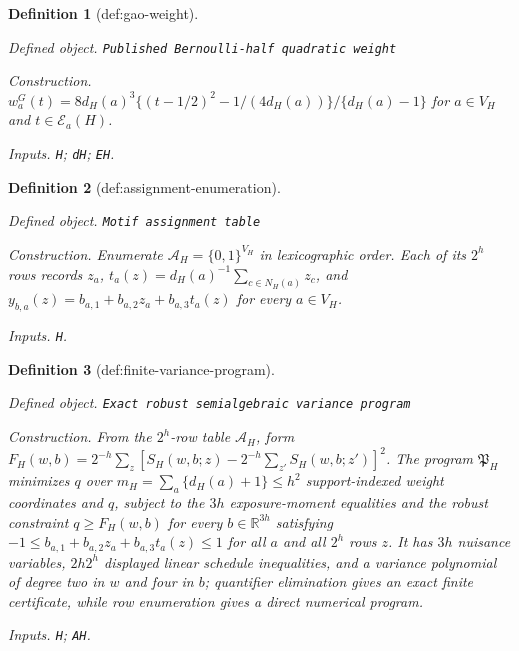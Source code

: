 \documentclass{article}
\newtheorem{definition}{Definition}
\begin{document}
\begin{definition}[def:gao-weight]\label{def:gao-weight}
\par\smallskip\noindent\emph{Defined object.} \texttt{Published Bernoulli-\allowbreak{}half quadratic weight}
\par\smallskip\noindent\emph{Construction.} \(w_a^{G}(t)=8d_H(a)^3\{(t-1/2)^2-1/(4d_H(a))\}/\{d_H(a)-1\}\) for \(a\in V_H\) and \(t\in\mathcal E_a(H)\).
\par\smallskip\noindent\emph{Inputs.} \texttt{H}; \texttt{dH}; \texttt{EH}.
\end{definition}

\begin{definition}[def:assignment-enumeration]\label{def:assignment-enumeration}
\par\smallskip\noindent\emph{Defined object.} \texttt{Motif assignment table}
\par\smallskip\noindent\emph{Construction.} Enumerate \(\mathcal A_H=\{0,1\}^{V_H}\) in lexicographic order. Each of its \(2^h\) rows records \(z_a\), \(t_a(z)=d_H(a)^{-1}\sum_{c\in N_H(a)}z_c\), and \(y_{b,a}(z)=b_{a,1}+b_{a,2}z_a+b_{a,3}t_a(z)\) for every \(a\in V_H\).
\par\smallskip\noindent\emph{Inputs.} \texttt{H}.
\end{definition}

\begin{definition}[def:finite-variance-program]\label{def:finite-variance-program}
\par\smallskip\noindent\emph{Defined object.} \texttt{Exact robust semialgebraic variance program}
\par\smallskip\noindent\emph{Construction.} From the \(2^h\)-row table \(\mathcal A_H\), form \(F_H(w,b)=2^{-h}\sum_z[S_H(w,b;z)-2^{-h}\sum_{z'}S_H(w,b;z')]^2\). The program \(\mathfrak P_H\) minimizes \(q\) over \(m_H=\sum_a\{d_H(a)+1\}\le h^2\) support-indexed weight coordinates and \(q\), subject to the \(3h\) exposure-moment equalities and the robust constraint \(q\ge F_H(w,b)\) for every \(b\in\mathbb R^{3h}\) satisfying \(-1\le b_{a,1}+b_{a,2}z_a+b_{a,3}t_a(z)\le1\) for all \(a\) and all \(2^h\) rows \(z\). It has \(3h\) nuisance variables, \(2h2^h\) displayed linear schedule inequalities, and a variance polynomial of degree two in \(w\) and four in \(b\); quantifier elimination gives an exact finite certificate, while row enumeration gives a direct numerical program.
\par\smallskip\noindent\emph{Inputs.} \texttt{H}; \texttt{AH}.
\end{definition}
\end{document}
